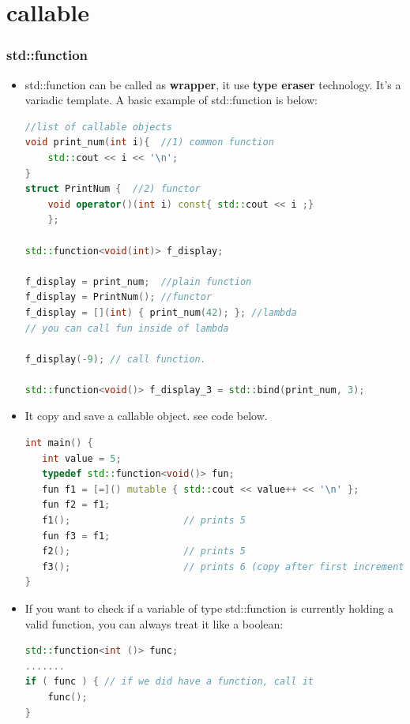\documentclass[a4paper,12pt,twoside]{book}
\begin{document}
\section{callable}
\subsubsection{std::function}
\begin{itemize}

\item std::function can be called as \textbf{wrapper}, it use \textbf{type eraser} technology. It's a variadic template. A basic example of std::function is below:
 
\begin{lstlisting}[frame=single, language=c++]
//list of callable objects
void print_num(int i){  //1) common function
    std::cout << i << '\n';
}
struct PrintNum {  //2) functor
    void operator()(int i) const{ std::cout << i ;}
    };

std::function<void(int)> f_display;

f_display = print_num;  //plain function
f_display = PrintNum(); //functor
f_display = [](int) { print_num(42); }; //lambda
// you can call fun inside of lambda

f_display(-9); // call function.

std::function<void()> f_display_3 = std::bind(print_num, 3);
\end{lstlisting}

\item It copy and save a callable object. see code below.
\begin{lstlisting}[frame=single, language=c++]
int main() {
   int value = 5;
   typedef std::function<void()> fun;
   fun f1 = [=]() mutable { std::cout << value++ << '\n' };
   fun f2 = f1;
   f1();                    // prints 5
   fun f3 = f1;
   f2();                    // prints 5
   f3();                    // prints 6 (copy after first increment)
}
\end{lstlisting}

\item If you want to check if a variable of type std::function is currently holding a valid function, you can always treat it like a boolean:
\begin{lstlisting}[frame=single, language=c++]
std::function<int ()> func;
.......
if ( func ) { // if we did have a function, call it
    func();
}
\end{lstlisting}


\end{itemize}
\end{document}
